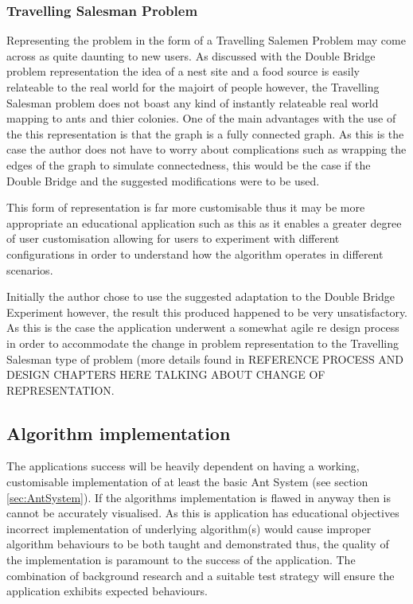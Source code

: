 \subsubsection{Travelling Salesman Problem}

Representing the problem in the form of a Travelling Salemen Problem may come across as quite daunting to new users. As discussed with the Double Bridge problem representation the idea of a nest site and a food source is easily relateable to the real world for the majoirt of people however, the Travelling Salesman problem does not boast any kind of instantly relateable real world mapping to ants and thier colonies. One of the main advantages with the use of the this representation is that the graph is a fully connected graph. As this is the case the author does not have to worry about complications such as wrapping the edges of the graph to simulate connectedness, this would be the case if the Double Bridge and the suggested modifications were to be used.

This form of representation is far more customisable thus it may be more appropriate an educational application such as this as it enables a greater degree of user customisation allowing for users to experiment with different configurations in order to understand how the algorithm operates in different scenarios.

Initially the author chose to use the suggested adaptation to the Double Bridge Experiment however, the result this produced happened to be very unsatisfactory. As this is the case the application underwent a somewhat agile re design process in order to accommodate the change in problem representation to the Travelling Salesman type of problem (more details found in \Large {REFERENCE PROCESS AND DESIGN CHAPTERS HERE TALKING ABOUT CHANGE OF REPRESENTATION.} \normalsize
\subsection{Algorithm implementation}

The applications success will be heavily dependent on having a working, customisable implementation of at least the basic Ant System (see section \ref{sec:AntSystem}). If the algorithms implementation is flawed in anyway then is cannot be accurately visualised. As this is application has educational objectives incorrect implementation of underlying algorithm(s) would cause improper algorithm behaviours to be both taught and demonstrated thus, the quality of the implementation is paramount to the success of the application. The combination of background research and a suitable test strategy will ensure the application exhibits expected behaviours.

